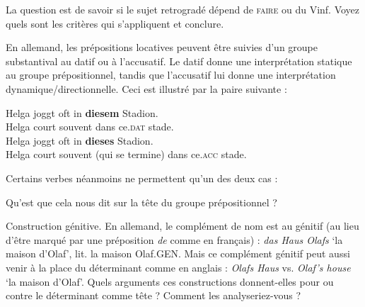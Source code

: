 {    La question est de savoir si le sujet retrogradé dépend de \textsc{faire} ou du Vinf. Voyez quels sont les critères qui s’appliquent et conclure.

     En allemand, les prépositions locatives peuvent être suivies d’un groupe substantival au datif ou à l’accusatif. Le datif donne une interprétation statique au groupe prépositionnel, tandis que l’accusatif lui donne une interprétation dynamique/directionnelle. Ceci est illustré par la paire suivante :

    \ea
    \ea
    \gll   Helga joggt oft in \textbf{diesem} Stadion.\\
    Helga court souvent dans ce.\textsc{dat} stade.\\
    \ex
    \gll   Helga joggt oft in \textbf{dieses} Stadion.\\
    Helga court souvent (qui se termine) dans ce.\textsc{acc} stade.\\
    \z
    \z

    Certains verbes néanmoins ne permettent qu’un des deux cas :

    \ea



    \z
    \z

    Qu’est que cela nous dit sur la tête du groupe prépositionnel ?

     Construction génitive. En allemand, le complément de nom est au génitif (au lieu d’être marqué par une préposition \textit{de} comme en français) : \textit{das Haus Olafs} ‘la maison d’Olaf’, lit. la maison Olaf.GEN. Mais ce complément génitif peut aussi venir à la place du déterminant comme en anglais : \textit{Olafs Haus} vs. \textit{Olaf’s house} ‘la maison d’Olaf’. Quels arguments ces constructions donnent-elles pour ou contre le déterminant comme tête ? Comment les analyseriez-vous ?
}
